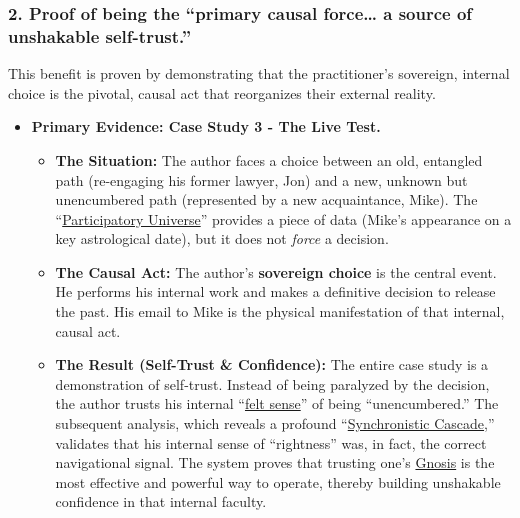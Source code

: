 \documentclass{article}
\begin{document}
\subsubsection*{2. Proof of being the ``primary causal force\ldots{} a source of unshakable self-trust.''}\label{proof-of-being-the-primary-causal-force-a-source-of-unshakable-self-trust.}

This benefit is proven by demonstrating that the practitioner's sovereign, internal choice is the pivotal, causal act that reorganizes their external reality.

\begin{itemize}
\item
  \textbf{Primary Evidence: Case Study 3 - The Live Test.}

  \begin{itemize}
  \item
    \textbf{The Situation:} The author faces a choice between an old, entangled path (re-engaging his former lawyer, Jon) and a new, unknown but unencumbered path (represented by a new acquaintance, Mike). The ``\hyperlink{gloss:participatory_universe}{Participatory Universe}'' provides a piece of data (Mike's appearance on a key astrological date), but it does not \emph{force} a decision.
  \item
    \textbf{The Causal Act:} The author's \textbf{sovereign choice} is the central event. He performs his internal work and makes a definitive decision to release the past. His email to Mike is the physical manifestation of that internal, causal act.
  \item
    \textbf{The Result (Self-Trust \& Confidence):} The entire case study is a demonstration of self-trust. Instead of being paralyzed by the decision, the author trusts his internal ``\hyperlink{gloss:felt_sense}{felt sense}'' of being ``unencumbered.'' The subsequent analysis, which reveals a profound ``\hyperlink{gloss:synchronistic_cascade}{Synchronistic Cascade},'' validates that his internal sense of ``rightness'' was, in fact, the correct navigational signal. The system proves that trusting one's \hyperlink{gloss:gnosis}{Gnosis} is the most effective and powerful way to operate, thereby building unshakable confidence in that internal faculty.
  \end{itemize}
\end{itemize}
\end{document}

